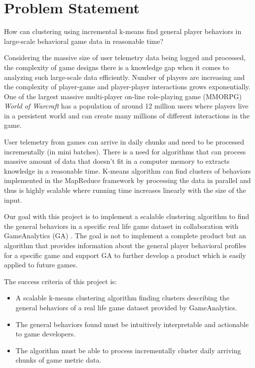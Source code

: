 \section{Problem Statement}

{\addtolength{\leftskip}{5mm} How can clustering using incremental k-means find general player behaviors in large-scale behavioral game data in reasonable time? \par}

Considering the massive size of user telemetry data being logged and processed, the complexity of game designs there is a knowledge gap when it comes to analyzing such large-scale data efficiently. Number of players are increasing and the complexity of player-game and player-player interactions grows exponentially. One of the largest massive multi-player on-line role-playing game (MMORPG) \textit{World of Warcraft} has a population of around 12 million users where players live in a persistent world and can create many millions of different interactions in the game. 

User telemetry from games can arrive in daily chunks and need to be processed incrementally (in mini batches). There is a need for algorithms that can process massive amount of data that doesn't fit in a computer memory to extracts knowledge in a reasonable time. K-means algorithm can find clusters of behaviors implemented in the MapReduce framework by processing the data in parallel and thus is highly scalable where running time increases linearly with the size of the input. 

Our goal with this project is to implement a scalable clustering algorithm to find the general behaviors in a specific real life game dataset in collaboration with GameAnalytics (GA) \citep{GA2013}. The goal is not to implement a complete product but an algorithm that provides information about the general player behavioral profiles for a specific game and support GA to further develop a product which is easily applied to future games. 

The success criteria of this project is:
\begin{itemize}
\item A scalable k-means clustering algorithm finding clusters describing the general behaviors of a real life game dataset provided by GameAnalytics.
\item The general behaviors found must be intuitively interpretable and actionable to game developers.
\item The algorithm must be able to process incrementally cluster daily arriving chunks of game metric data.
\end{itemize}

